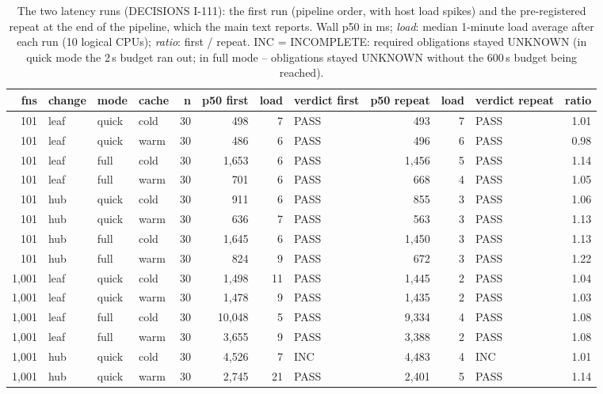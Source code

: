 \begin{table}[h!]
\centering
\footnotesize
\setlength{\tabcolsep}{4pt}
\caption{The two latency runs (DECISIONS I-111): the first run (pipeline order, with host load spikes) and the pre-registered repeat at the end of the pipeline, which the main text reports. Wall p50 in ms; \emph{load}: median 1-minute load average after each run (10 logical CPUs); \emph{ratio}: first / repeat. INC = INCOMPLETE: required obligations stayed UNKNOWN (in quick mode the 2\,s budget ran out; in full mode \LatFullUnresolvedMin--\LatFullUnresolvedMax{} obligations stayed UNKNOWN without the 600\,s budget being reached).}
\label{tab:latency-runs}
\begin{tabular}{rlllrrrlrrlr}
\toprule
fns & change & mode & cache & n & p50 first & load & verdict first & p50 repeat & load & verdict repeat & ratio \\
\midrule
101 & leaf & quick & cold & 30 & 498 & 7 & PASS & 493 & 7 & PASS & 1.01 \\
101 & leaf & quick & warm & 30 & 486 & 6 & PASS & 496 & 6 & PASS & 0.98 \\
101 & leaf & full & cold & 30 & 1{,}653 & 6 & PASS & 1{,}456 & 5 & PASS & 1.14 \\
101 & leaf & full & warm & 30 & 701 & 6 & PASS & 668 & 4 & PASS & 1.05 \\
101 & hub & quick & cold & 30 & 911 & 6 & PASS & 855 & 3 & PASS & 1.06 \\
101 & hub & quick & warm & 30 & 636 & 7 & PASS & 563 & 3 & PASS & 1.13 \\
101 & hub & full & cold & 30 & 1{,}645 & 6 & PASS & 1{,}450 & 3 & PASS & 1.13 \\
101 & hub & full & warm & 30 & 824 & 9 & PASS & 672 & 3 & PASS & 1.22 \\
1{,}001 & leaf & quick & cold & 30 & 1{,}498 & 11 & PASS & 1{,}445 & 2 & PASS & 1.04 \\
1{,}001 & leaf & quick & warm & 30 & 1{,}478 & 9 & PASS & 1{,}435 & 2 & PASS & 1.03 \\
1{,}001 & leaf & full & cold & 30 & 10{,}048 & 5 & PASS & 9{,}334 & 4 & PASS & 1.08 \\
1{,}001 & leaf & full & warm & 30 & 3{,}655 & 9 & PASS & 3{,}388 & 2 & PASS & 1.08 \\
1{,}001 & hub & quick & cold & 30 & 4{,}526 & 7 & INC & 4{,}483 & 4 & INC & 1.01 \\
1{,}001 & hub & quick & warm & 30 & 2{,}745 & 21 & PASS & 2{,}401 & 5 & PASS & 1.14 \\

\end{tabular}
\end{table}

